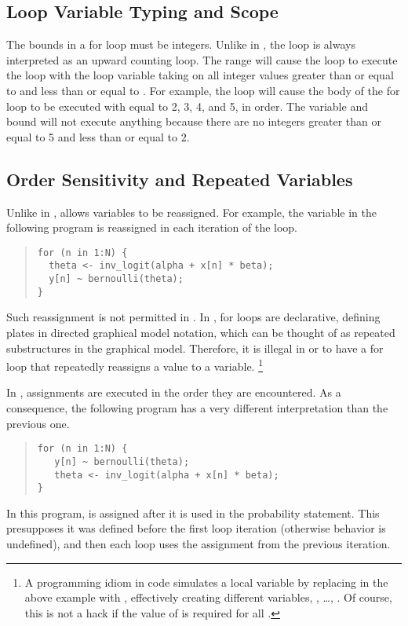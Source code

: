 \subsection{Loop Variable Typing and Scope}

The bounds in a for loop must be integers.  Unlike in \R, the loop is
always interpreted as an upward counting loop.  The range 
will cause the loop to execute the loop with the loop variable taking
on all integer values greater than or equal to  and less than
or equal to .  For example, the loop 
will cause the body of the for loop to be executed with  equal
to 2, 3, 4, and 5, in order.  The variable and bound  will not execute anything because there are no integers
greater than or equal to 5 and less than or equal to 2.

\subsection{Order Sensitivity and Repeated Variables}

Unlike in \BUGS, \Stan allows variables to be reassigned.  For
example, the variable  in the following program is
reassigned in each iteration of the loop.
%
\begin{quote}
\begin{Verbatim} 
for (n in 1:N) {
  theta <- inv_logit(alpha + x[n] * beta);
  y[n] ~ bernoulli(theta);
}
\end{Verbatim}
\end{quote}
% 
Such reassignment is not permitted in \BUGS.  In \BUGS, for loops are
declarative, defining plates in directed graphical model notation,
which can be thought of as repeated substructures in the graphical
model.  Therefore, it is illegal in \BUGS or \JAGS to have a for loop
that repeatedly reassigns a value to a variable.%
%
\footnote{A programming idiom in \BUGS code simulates 
a local variable by replacing  in the above example with
, effectively creating  different variables,
, \ldots, .  Of course, this is not a
hack if the value of  is required for all .}

In \Stan, assignments are executed in the order they are encountered.
As a consequence, the following \Stan program has a very different
interpretation than the previous one.
%
\begin{quote}
\begin{Verbatim}[fontsize=\small]
for (n in 1:N) {
   y[n] ~ bernoulli(theta);
   theta <- inv_logit(alpha + x[n] * beta);
}
\end{Verbatim}
\end{quote}
%
In this program,  is assigned after it is used in the
probability statement.  This presupposes it was defined before the
first loop iteration (otherwise behavior is undefined), and then each
loop uses the assignment from the previous iteration. 

